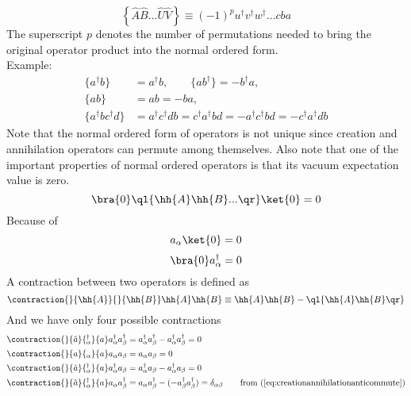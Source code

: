 \begin{equation}
\left \{ \hat{A}\hat{B}...\hat{U}\hat{V} \right \} \equiv (-1)^{p} u^{\dagger}v^{\dagger}w^{\dagger}...cba 
 \label{def:normalorder}
\end{equation}
%
The superscript $p$ denotes the number of permutations needed to bring the original operator product into the normal ordered form. 
\\   %
Example:
\begin{align}
\{a^{\dagger}b\} &= a^{\dagger}b, \qquad \{ab^{\dagger}\} = -b^{\dagger}a, \nonumber \\
\{ab\} &= ab = -ba, \\
\{a^{\dagger}bc^{\dagger}d\} & = a^{\dagger} c^{\dagger} db = c^{\dagger}a^{\dagger} bd = -a^{\dagger} c^{\dagger}bd =  -c^{\dagger} a^{\dagger}db \nonumber
  \label{ex:normalorder}
\end{align}
Note that the normal ordered form of operators is not unique since creation and annihilation operators can permute among themselves. Also note that one of the important properties of normal ordered operators is that its vacuum expectation value is zero. 
\begin{equation}
\bra{0}\ql\{\hh{A}\hh{B}...\qr\}\ket{0} = 0
 \label{show:vacuumexpectnormalorder}
\end{equation}
%
Because of 
\begin{equation}
a_\alpha\ket{0} = 0
\label{eq:becauseannihilation} 
\end{equation}
\begin{equation}
\bra{0}a^\dagger_\alpha = 0
\label{eq:becausecreation} 
\end{equation}
%
A contraction between two operators is defined as
\begin{equation}
\contraction{}{\hh{A} }{}{\hh{B}}
\hh{A}\hh{B} \equiv \hh{A} \hh{B} - \ql \{ \hh{A} \hh{B} \qr \}
 \label{def:contraction}
\end{equation}
%
And we have only four possible contractions
\begin{align}
\contraction{}{\hat{a}}{{}_{\alpha}^{\dagger}}{a}
a_{\alpha}^{\dagger}a_{\beta}^{\dagger} &= a_{\alpha}^{\dagger}a_{\beta}^{\dagger} - a_{\alpha}^{\dagger}a_{\beta}^{\dagger} = 0 \\
\contraction{}{a}{{}_{\alpha}}{a}
a_{\alpha}a_{\beta} &= a_{\alpha}a_{\beta} = 0 \\
\contraction{}{\hat{a}}{{}_{\alpha}^{\dagger}}{a}
a_{\alpha}^{\dagger}a_{\beta} &= a_{\alpha}^{\dagger}a_{\beta} - a_{\alpha}^{\dagger}a_{\beta} = 0 \\
\contraction{}{\hat{a}}{{}_{\alpha}^{\dagger}}{a}
a_{\alpha}a_{\beta}^{\dagger} &= a_{\alpha}a_{\beta}^{\dagger} - ( - a_{\beta}^{\dagger}a_{\beta}^{\dagger} ) = \delta_{\alpha\beta} \qquad \text{from (\ref{eq:creationannihilationanticommute})}
 \label{eq:contractionpossibilities}
\end{align}
